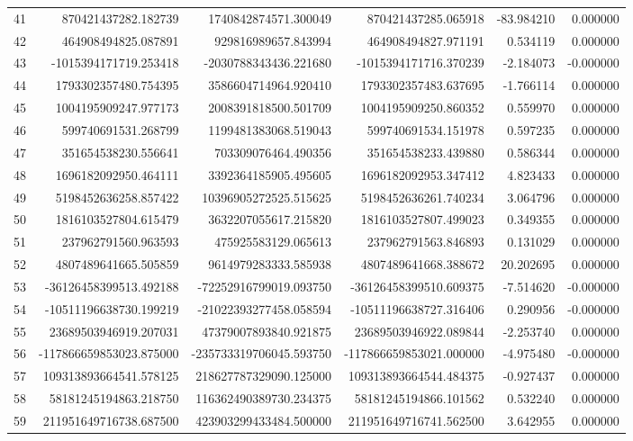 \begin{tabular}{lrrrrr}
41 & 870421437282.182739 & 1740842874571.300049 & 870421437285.065918 & -83.984210 & 0.000000 \\
42 & 464908494825.087891 & 929816989657.843994 & 464908494827.971191 & 0.534119 & 0.000000 \\
43 & -1015394171719.253418 & -2030788343436.221680 & -1015394171716.370239 & -2.184073 & -0.000000 \\
44 & 1793302357480.754395 & 3586604714964.920410 & 1793302357483.637695 & -1.766114 & 0.000000 \\
45 & 1004195909247.977173 & 2008391818500.501709 & 1004195909250.860352 & 0.559970 & 0.000000 \\
46 & 599740691531.268799 & 1199481383068.519043 & 599740691534.151978 & 0.597235 & 0.000000 \\
47 & 351654538230.556641 & 703309076464.490356 & 351654538233.439880 & 0.586344 & 0.000000 \\
48 & 1696182092950.464111 & 3392364185905.495605 & 1696182092953.347412 & 4.823433 & 0.000000 \\
49 & 5198452636258.857422 & 10396905272525.515625 & 5198452636261.740234 & 3.064796 & 0.000000 \\
50 & 1816103527804.615479 & 3632207055617.215820 & 1816103527807.499023 & 0.349355 & 0.000000 \\
51 & 237962791560.963593 & 475925583129.065613 & 237962791563.846893 & 0.131029 & 0.000000 \\
52 & 4807489641665.505859 & 9614979283333.585938 & 4807489641668.388672 & 20.202695 & 0.000000 \\
53 & -36126458399513.492188 & -72252916799019.093750 & -36126458399510.609375 & -7.514620 & -0.000000 \\
54 & -10511196638730.199219 & -21022393277458.058594 & -10511196638727.316406 & 0.290956 & -0.000000 \\
55 & 23689503946919.207031 & 47379007893840.921875 & 23689503946922.089844 & -2.253740 & 0.000000 \\
56 & -117866659853023.875000 & -235733319706045.593750 & -117866659853021.000000 & -4.975480 & -0.000000 \\
57 & 109313893664541.578125 & 218627787329090.125000 & 109313893664544.484375 & -0.927437 & 0.000000 \\
58 & 58181245194863.218750 & 116362490389730.234375 & 58181245194866.101562 & 0.532240 & 0.000000 \\
59 & 211951649716738.687500 & 423903299433484.500000 & 211951649716741.562500 & 3.642955 & 0.000000 \\

\end{tabular}

